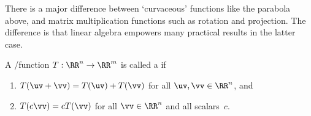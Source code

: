 There is a major difference between `curvaceous' functions like the parabola above, and matrix multiplication functions such as rotation and projection.
The difference is that linear algebra empowers many practical results in the latter case.



\begin{definition} \label{def:lintran} 
A \slash function \(T:\RR^n\to\RR^m\) is called a  if
\begin{enumerate}
\item\label{def:lintran:i} \(T(\uv+\vv)=T(\uv)+T(\vv)\) for all \(\uv,\vv\in\RR^n\), and
\item\label{def:lintran:ii} \(T(c\vv)=cT(\vv)\) for all \(\vv\in\RR^n\) and all scalars~\(c\).
\end{enumerate}
\end{definition}


